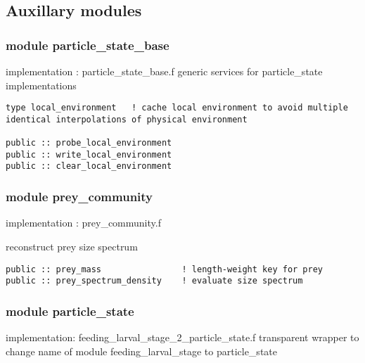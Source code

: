 \subsection{Auxillary modules}

\subsubsection{module particle\_state\_base}                                      
implementation : particle\_state\_base.f
generic services for particle\_state implementations

\begin{verbatim}
type local_environment   ! cache local environment to avoid multiple identical interpolations of physical environment

public :: probe_local_environment
public :: write_local_environment
public :: clear_local_environment
\end{verbatim}

\subsubsection{module prey\_community}                                           
implementation : prey\_community.f

reconstruct prey size spectrum
\begin{verbatim}
public :: prey_mass                ! length-weight key for prey
public :: prey_spectrum_density    ! evaluate size spectrum 
\end{verbatim}
\subsubsection{module particle\_state}                                           
implementation: feeding\_larval\_stage\_2\_particle\_state.f
transparent wrapper to change name of module feeding\_larval\_stage to particle\_state      



